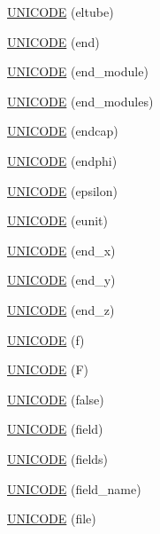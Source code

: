 \begin{DoxyCompactItemize}
\hyperlink{namespace_d_d4hep_1_1_x_m_l_a8f000ee2b91c21acb1583c9eb9ec74a8}{U\+N\+I\+C\+O\+DE} (eltube)
\item 
\hyperlink{namespace_d_d4hep_1_1_x_m_l_af964c103691c510213490e00e9373639}{U\+N\+I\+C\+O\+DE} (end)
\item 
\hyperlink{namespace_d_d4hep_1_1_x_m_l_a4ccbcefdca64e3237cce356697a67003}{U\+N\+I\+C\+O\+DE} (end\+\_\+module)
\item 
\hyperlink{namespace_d_d4hep_1_1_x_m_l_a71896f19880670155b5a791f993445f0}{U\+N\+I\+C\+O\+DE} (end\+\_\+modules)
\item 
\hyperlink{namespace_d_d4hep_1_1_x_m_l_ad2fa7fd572a2aff53ee1a32481231d97}{U\+N\+I\+C\+O\+DE} (endcap)
\item 
\hyperlink{namespace_d_d4hep_1_1_x_m_l_a8a8945afa2abad567660f2300ddd57ac}{U\+N\+I\+C\+O\+DE} (endphi)
\item 
\hyperlink{namespace_d_d4hep_1_1_x_m_l_a58d4a2a7ccdbb17384af3ca5b3730015}{U\+N\+I\+C\+O\+DE} (epsilon)
\item 
\hyperlink{namespace_d_d4hep_1_1_x_m_l_ae3b540d035bb70cc7b5bbcc83dd6e5e7}{U\+N\+I\+C\+O\+DE} (eunit)
\item 
\hyperlink{namespace_d_d4hep_1_1_x_m_l_ad66d24eb24d6f2b7e423bd83673a2f3f}{U\+N\+I\+C\+O\+DE} (end\+\_\+x)
\item 
\hyperlink{namespace_d_d4hep_1_1_x_m_l_a03bba48af937c9c678afd85d1340fab9}{U\+N\+I\+C\+O\+DE} (end\+\_\+y)
\item 
\hyperlink{namespace_d_d4hep_1_1_x_m_l_a634a3a5c2933f3a4c80378890aa22a58}{U\+N\+I\+C\+O\+DE} (end\+\_\+z)
\item 
\hyperlink{namespace_d_d4hep_1_1_x_m_l_adc297351330354fec9592f11f7c767aa}{U\+N\+I\+C\+O\+DE} (f)
\item 
\hyperlink{namespace_d_d4hep_1_1_x_m_l_a5f083cc6152ec884623bb2c62bf1cd69}{U\+N\+I\+C\+O\+DE} (F)
\item 
\hyperlink{namespace_d_d4hep_1_1_x_m_l_a2267483060419643154ae147a414f968}{U\+N\+I\+C\+O\+DE} (false)
\item 
\hyperlink{namespace_d_d4hep_1_1_x_m_l_ae1a9c1ee7a5bef7958dd5dad3728ac79}{U\+N\+I\+C\+O\+DE} (field)
\item 
\hyperlink{namespace_d_d4hep_1_1_x_m_l_ae0c92c81b03134307593eb2a6561764a}{U\+N\+I\+C\+O\+DE} (fields)
\item 
\hyperlink{namespace_d_d4hep_1_1_x_m_l_a1230bf8cd34b5bc768384fa689b4d4fc}{U\+N\+I\+C\+O\+DE} (field\+\_\+name)
\item 
\hyperlink{namespace_d_d4hep_1_1_x_m_l_a6ef220c00df7ac52924e11ac861be82c}{U\+N\+I\+C\+O\+DE} (file)

\end{DoxyCompactItemize}
